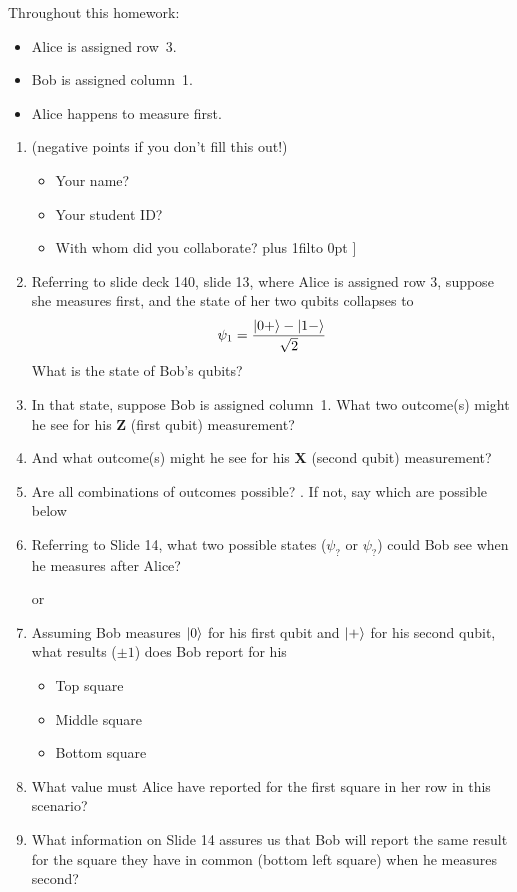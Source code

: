 \documentclass[12pt]{article}
\def\DefaultSpace{1in}
\newcommand{\LeaveSpace}[1][\DefaultSpace]{%
\vskip #1 plus 1fil\relax\hbox to 0pt{\hss} %
}
\begin{document}
Throughout this homework:
\begin{itemize}
    \item Alice is assigned row~3.
    \item Bob is assigned column~1.  
    \item Alice happens to measure first.
    \end{itemize}
\begin{enumerate}[font=\bfseries]
\item {} (negative points if you don't fill this out!)
\begin{itemize}
    \item Your name?
    \item Your student ID?
    \item With whom did you collaborate?
    \LeaveSpace{}]
\end{itemize}
    \item {} Referring to slide deck 140, slide 13, where Alice is assigned row 3, suppose she measures first, and the state of her two qubits collapses to \[ \psi_{1}=\frac{\ket{0+}-\ket{1-}}{\sqrt{2}} \]
    What is the state of Bob's qubits? \Blank[2in]
    
    \item {} In that state, suppose Bob is assigned column~1.  What two outcome(s) might he see for his \textbf{Z} (first qubit) measurement?
    
    \Blank[2in]
    \item {} And what outcome(s) might he see for his \textbf{X} (second qubit) measurement?
    
    \Blank[2in]
    
    \item {} Are all combinations of outcomes possible?  \Blank{}.  If not, say which are possible below
    
    \Blank[2in]{}
    \item {} Referring to Slide 14, what two possible states ($\psi_{?}$ or $\psi_{?}$) could Bob see when he measures after Alice?
    
    \Blank{} or \Blank{}
    \item {} Assuming Bob measures $\ket{0}$ for his first qubit and $\ket{+}$ for his second qubit, what results ($\pm 1$) does Bob report for his
    \begin{itemize}
        \item Top square \Blank{}
        \item Middle square \Blank{}
        \item Bottom square \Blank{}
    \end{itemize}
    \item {} What value must Alice have reported for the first square in her row in this scenario? \Blank{}
    \item {} What information on Slide 14 assures us that Bob will report the same result for the square they have in common (bottom left square) when he measures second?
    
\end{enumerate}
\end{document}
